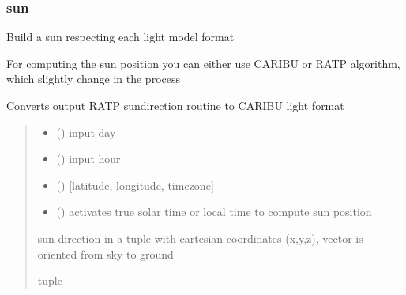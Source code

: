 \documentclass[letterpaper,10pt,english]{sphinxmanual}
\begin{document}
\subsubsection{sun}
\label{\detokenize{reference:sun}}
\sphinxAtStartPar
Build a sun respecting each light model format

\sphinxAtStartPar
For computing the sun position you can either use CARIBU or RATP algorithm, which slightly change
in the process

\begin{fulllineitems}
\label{\detokenize{reference:sun.ratp_sun}}
\pysigstartsignatures
{}
\pysigstopsignatures
\sphinxAtStartPar
Converts output RATP sundirection routine to CARIBU light format
\begin{quote}\begin{description}
\begin{itemize}
\item {} 
\sphinxAtStartPar
{} () \textendash{} input day

\item {} 
\sphinxAtStartPar
{} () \textendash{} input hour

\item {} 
\sphinxAtStartPar
{} () \textendash{} {[}latitude, longitude, timezone{]}

\item {} 
\sphinxAtStartPar
{} () \textendash{} activates true solar time or local time to compute sun position

\end{itemize}

\sphinxAtStartPar
sun direction in a tuple with cartesian coordinates (x,y,z), vector is oriented from sky to ground

\sphinxAtStartPar
tuple

\end{description}\end{quote}

\end{fulllineitems}
\end{document}
